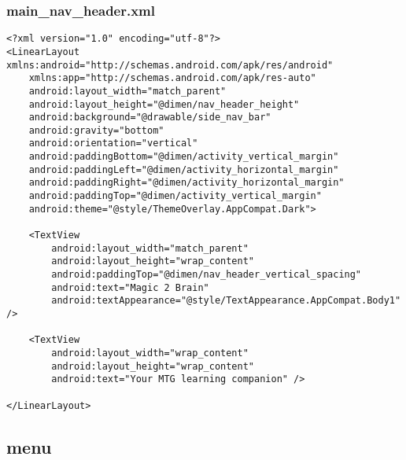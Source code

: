 \subsubsection{main\_nav\_header.xml}
\begin{lstlisting}
<?xml version="1.0" encoding="utf-8"?>
<LinearLayout xmlns:android="http://schemas.android.com/apk/res/android"
    xmlns:app="http://schemas.android.com/apk/res-auto"
    android:layout_width="match_parent"
    android:layout_height="@dimen/nav_header_height"
    android:background="@drawable/side_nav_bar"
    android:gravity="bottom"
    android:orientation="vertical"
    android:paddingBottom="@dimen/activity_vertical_margin"
    android:paddingLeft="@dimen/activity_horizontal_margin"
    android:paddingRight="@dimen/activity_horizontal_margin"
    android:paddingTop="@dimen/activity_vertical_margin"
    android:theme="@style/ThemeOverlay.AppCompat.Dark">

    <TextView
        android:layout_width="match_parent"
        android:layout_height="wrap_content"
        android:paddingTop="@dimen/nav_header_vertical_spacing"
        android:text="Magic 2 Brain"
        android:textAppearance="@style/TextAppearance.AppCompat.Body1" />

    <TextView
        android:layout_width="wrap_content"
        android:layout_height="wrap_content"
        android:text="Your MTG learning companion" />

</LinearLayout>
\end{lstlisting}

\subsection{menu}
